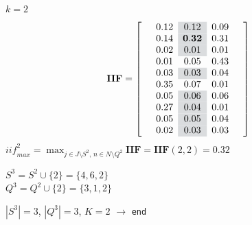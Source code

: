 \documentclass[aspectratio=149, compress]{beamer}
\newcommand\high{\cellcolor{template!20}}
\begin{document}
\begin{frame}{$k=2$}
	\vspace*{-4mm}
	\small
	\begin{equation*}
		\mathbf{IIF} =
		\left[\begin{array}{ccccc}
			&0.12	  & \high	0.12	  & 	0.09 & \\
			&0.14	  & 	\high \mathbf{0.32}	  & 	0.31 &\\
			&0.02	  & 	\high 0.01	  & 	0.01 &\\
			&0.01	  & 	0.05	  & 	0.43&\\
			&0.03	  & 	\high0.03	  & 	0.04&\\
			&0.35	  & 	0.07	  & 	0.01&\\
			&0.05	  & 	\high0.06	  & 	0.06&\\
			&0.27	  & 	\high0.04	  & 	0.01&\\
			&0.05	  & 	\high0.05	  & 	0.04&\\
			&0.02	  & 	\high0.03	  & 	0.03 &\\
		\end{array}\right]
	\end{equation*}
	\vspace{1.5mm}
	$\mathit{iif}_{max}^2=\displaystyle \max_{j \in J\setminus S^2, \, n  \in N \setminus Q^2} \mathbf{IIF} = \mathbf{IIF}(2,2) = 0.32$\\ \vspace{1.5mm}
	
			$S^{3} = S^2 \cup \{2\} = \{4, 6, 2\}$\\ \vspace{1.5mm}
			$Q^{3} = Q^2 \cup \{2\} = \{3,1, 2\}$\\ \vspace{1.5mm}
			
			\pause
			$|S^3| = 3$,   \hspace{3mm} $|Q^3| = 3$, $K = 2$ $\rightarrow$ \texttt{end}
\end{frame}
\end{document}
